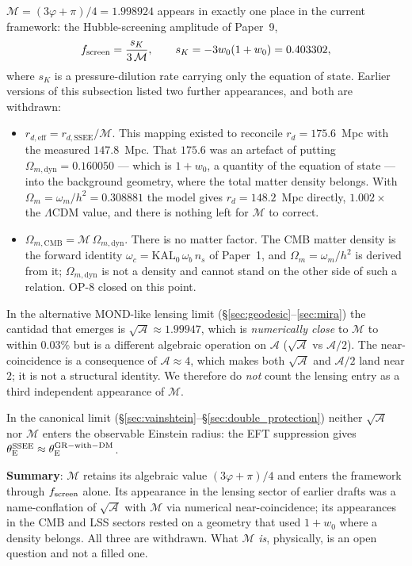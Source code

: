 \documentclass[12pt,a4paper]{article}
\newcommand{\phiG}{\varphi}
\newcommand{\MIRA}{\mathcal{M}}
\newcommand{\AURA}{\mathcal{A}}
\newcommand{\Omm}{\Omega_{m}}
\newcommand{\thetaE}{\theta_{\mathrm{E}}}
\begin{document}
$\MIRA = (3\phiG+\pi)/4 = 1.998924$ appears in exactly one place in the
current framework: the Hubble-screening amplitude of Paper~9,
\begin{equation}
  f_{\rm screen} = \frac{s_K}{3\,\MIRA}, \qquad
  s_K = -3w_0(1+w_0) = 0.403302,
\end{equation}
where $s_K$ is a pressure-dilution rate carrying only the equation of
state.  Earlier versions of this subsection listed two further
appearances, and both are withdrawn:
\begin{itemize}
  \item $r_{d,\mathrm{eff}} = r_{d,\mathrm{SSEE}}/\MIRA$.  This mapping
    existed to reconcile $r_d = 175.6$~Mpc with the measured $147.8$~Mpc.
    That $175.6$ was an artefact of putting $\Omega_{m,\mathrm{dyn}}=0.160050$
    --- which is $1+w_0$, a quantity of the equation of state --- into the
    background geometry, where the total matter density belongs.  With
    $\Omm = \omega_m/h^2 = 0.308881$ the model gives $r_d = 148.2$~Mpc
    directly, $1.002\times$ the $\Lambda$CDM value, and there is nothing
    left for $\MIRA$ to correct.
  \item $\Omega_{m,\mathrm{CMB}} = \MIRA\,\Omega_{m,\mathrm{dyn}}$.  There
    is no matter factor.  The CMB matter density is the forward identity
    $\omega_c = \mathrm{KAL}_0\,\omega_b\,n_s$ of Paper~1, and
    $\Omm = \omega_m/h^2$ is derived from it; $\Omega_{m,\mathrm{dyn}}$ is
    not a density and cannot stand on the other side of such a relation.
    OP-8 closed on this point.
\end{itemize}

In the alternative MOND-like lensing limit (\S\ref{sec:geodesic}--\ref{sec:mira})
the cantidad that emerges is $\sqrt{\AURA}\approx 1.99947$, which is
\emph{numerically close} to $\MIRA$ to within $0.03\%$ but is a different
algebraic operation on $\AURA$ ($\sqrt{\AURA}$ vs $\AURA/2$). The
near-coincidence is a consequence of $\AURA \approx 4$, which makes both
$\sqrt{\AURA}$ and $\AURA/2$ land near $2$; it is not a structural identity.
We therefore do \emph{not} count the lensing entry as a third independent
appearance of $\MIRA$.

In the canonical limit
(\S\ref{sec:vainshtein}--\S\ref{sec:double_protection}) neither $\sqrt{\AURA}$
nor $\MIRA$ enters the observable Einstein radius: the EFT suppression
gives $\thetaE^{\rm SSEE}\approx\thetaE^{\rm GR-with-DM}$.

\textbf{Summary}: $\MIRA$ retains its algebraic value $(3\phiG+\pi)/4$ and
enters the framework through $f_{\rm screen}$ alone.  Its appearance in the
lensing sector of earlier drafts was a name-conflation of $\sqrt{\AURA}$
with $\MIRA$ via numerical near-coincidence; its appearances in the CMB and
LSS sectors rested on a geometry that used $1+w_0$ where a density belongs.
All three are withdrawn.  What $\MIRA$ \emph{is}, physically, is an open
question and not a filled one.
\end{document}
